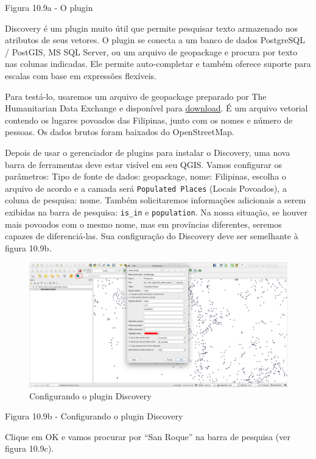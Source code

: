 \documentclass[
]{krantz}
\begin{document}
Figura 10.9a - O plugin

Discovery é um plugin muito útil que permite pesquisar texto armazenado nos atributos de seus vetores. O plugin se conecta a um banco de dados PostgreSQL / PostGIS, MS SQL Server, ou um arquivo de geopackage e procura por texto nas colunas indicadas. Ele permite auto-completar e também oferece suporte para escalas com base em expressões flexíveis.

Para testá-lo, usaremos um arquivo de geopackage preparado por The Humanitarian Data Exchange e disponível para \href{https://data.humdata.org/dataset/hotosm_phl_north_populated_places}{download}. É um arquivo vetorial contendo os lugares povoados das Filipinas, junto com os nomes e número de pessoas. Os dados brutos foram baixados do OpenStreetMap.

Depois de usar o gerenciador de plugins para instalar o Discovery, uma nova barra de ferramentas deve estar visível em seu QGIS. Vamos configurar os parâmetros: Tipo de fonte de dados: geopackage, nome: Filipinas, escolha o arquivo de acordo e a camada será \texttt{Populated\ Places} (Locais Povoados), a coluna de pesquisa: nome. Também solicitaremos informações adicionais a serem exibidas na barra de pesquisa: \texttt{is\_in} e \texttt{population}. Na nossa situação, se houver mais povoados com o mesmo nome, mas em províncias diferentes, seremos capazes de diferenciá-las. Sua configuração do Discovery deve ser semelhante à figura 10.9b.

\begin{figure}
\centering
\includegraphics{media/modulo10/fig109_b.png}
\caption{Configurando o plugin Discovery}
\end{figure}

Figura 10.9b - Configurando o plugin Discovery

Clique em OK e vamos procurar por ``San Roque'' na barra de pesquisa (ver figura 10.9c).
\end{document}
